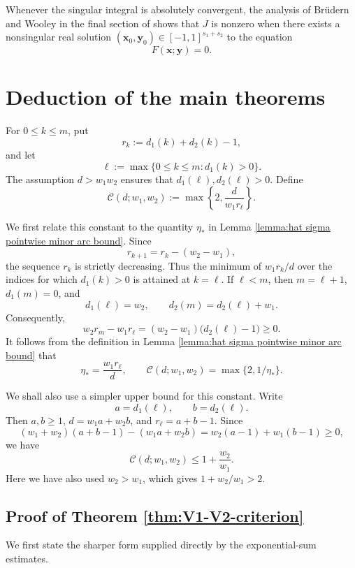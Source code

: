 \documentclass[12pt,reqno]{amsart}
\theoremstyle{definition}
\theoremstyle{remark}
\numberwithin{equation}{section}
\def\bfx{{\mathbf x}}
\def\bfy{{\mathbf y}}
\begin{document}
Whenever the singular integral is absolutely convergent, the analysis of Br\"{u}dern and
Wooley in the final section of \cite{Wooley2019} shows that $J$ is nonzero
when there exists a nonsingular real solution
$(\bfx_0,\bfy_0)\in[-1,1]^{s_1+s_2}$ to the equation
\[F(\bfx;\bfy) = 0.\]


\section{Deduction of the main theorems}

For $0\leq k\leq m$, put
\[
    r_k:=d_1(k)+d_2(k)-1,
\]
and let
\[
    \ell:=\max\{0\leq k\leq m:d_1(k)>0\}.
\]
The assumption $d>w_1w_2$ ensures that
$d_1(\ell),d_2(\ell)>0$. Define
\[
    \mathcal C(d;w_1,w_2)
    :=\max\left\{2,\frac{d}{w_1r_\ell}\right\}.
\]

We first relate this constant to the quantity $\eta_*$ in Lemma
\ref{lemma:hat sigma pointwise minor arc bound}. Since
\[
    r_{k+1}=r_k-(w_2-w_1),
\]
the sequence $r_k$ is strictly decreasing. Thus the minimum of
$w_1r_k/d$ over the indices for which $d_1(k)>0$ is attained at
$k=\ell$. If $\ell<m$, then $m=\ell+1$, $d_1(m)=0$, and
\[
    d_1(\ell)=w_2,
    \qquad
    d_2(m)=d_2(\ell)+w_1.
\]
Consequently,
\[
    w_2r_m-w_1r_\ell
    =(w_2-w_1)\bigl(d_2(\ell)-1\bigr)\geq0.
\]
It follows from the definition in Lemma
\ref{lemma:hat sigma pointwise minor arc bound} that
\[
    \eta_*=\frac{w_1r_\ell}{d},
    \qquad
    \mathcal C(d;w_1,w_2)=\max\{2,1/\eta_*\}.
\]

We shall also use a simpler upper bound for this constant. Write
\[
    a=d_1(\ell),
    \qquad
    b=d_2(\ell).
\]
Then $a,b\geq1$, $d=w_1a+w_2b$, and $r_\ell=a+b-1$. Since
\[
    (w_1+w_2)(a+b-1)-(w_1a+w_2b)
    =w_2(a-1)+w_1(b-1)\geq0,
\]
we have
\begin{equation}\label{eq:C simple upper bound}
    \mathcal C(d;w_1,w_2)
    \leq 1+\frac{w_2}{w_1}.
\end{equation}
Here we have also used $w_2>w_1$, which gives
$1+w_2/w_1>2$.

\subsection{Proof of Theorem \ref{thm:V1-V2-criterion}}

We first state the sharper form supplied directly by the exponential-sum
estimates.
\end{document}

